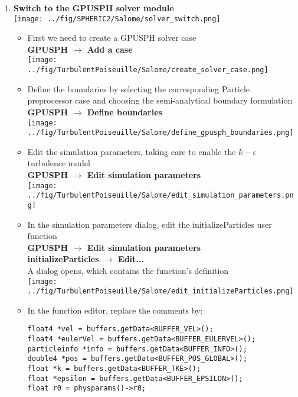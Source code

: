 \documentclass{../GPUSPHtemplate}
\begin{document}
\begin{enumerate}
\item \textbf{Switch to the GPUSPH solver module}  \smallskip\\
  \texttt{[image: ../fig/SPHERIC2/Salome/solver\_switch.png]}
  \begin{itemize}
  \item First we need to create a GPUSPH solver case\\
    \textbf{GPUSPH $\to$ Add a case}\smallskip\\
    \texttt{[image: ../fig/TurbulentPoiseuille/Salome/create\_solver\_case.png]}
  \item Define the boundaries by selecting the corresponding Particle preprocessor case and choosing the semi-analytical boundary formulation\\
    \textbf{GPUSPH $\to$ Define boundaries}\smallskip\\
    \texttt{[image: ../fig/TurbulentPoiseuille/Salome/define\_gpusph\_boundaries.png]}
  \item Edit the simulation parameters, taking care to enable the $k-\epsilon$ turbulence model \\
    \textbf{GPUSPH $\to$ Edit simulation parameters}\smallskip\\
    \texttt{[image: ../fig/TurbulentPoiseuille/Salome/edit\_simulation\_parameters.png]}\medskip
  \item In the simulation parameters dialog, edit the initializeParticles user function\\
    \textbf{GPUSPH $\to$ Edit simulation parameters}\\
    \textbf{initializeParticles $\to$ Edit...}\\
    A dialog opens, which contains the function's definition\smallskip\\
    \texttt{[image: ../fig/TurbulentPoiseuille/Salome/edit\_initializeParticles.png]}\medskip
\item In the function editor, replace the comments by:
    \begin{lstlisting}
float4 *vel = buffers.getData<BUFFER_VEL>();
float4 *eulerVel = buffers.getData<BUFFER_EULERVEL>();
particleinfo *info = buffers.getData<BUFFER_INFO>();
double4 *pos = buffers.getData<BUFFER_POS_GLOBAL>();
float *k = buffers.getData<BUFFER_TKE>();
float *epsilon = buffers.getData<BUFFER_EPSILON>();
float r0 = physparams()->r0;

\end{lstlisting}
\end{itemize}
\end{enumerate}
\end{document}
